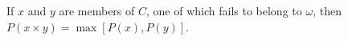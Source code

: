 If $x$ and $y$ are members of $C$, one of which fails to belong to $\omega$, then $P(x \times y) = \max [P(x), P(y)]$.
